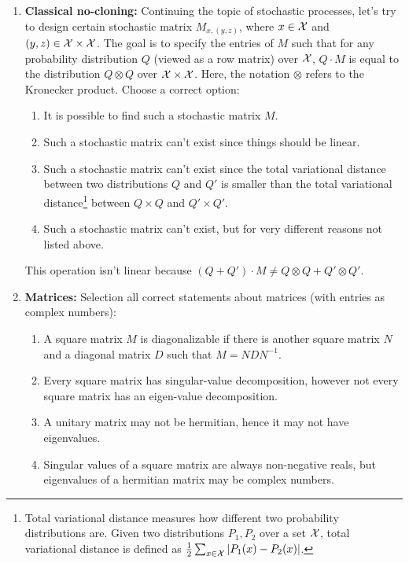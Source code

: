 \documentclass[11pt, svgnames]{article}
\begin{document}
\begin{enumerate}
\item {\bf Classical no-cloning:} Continuing the topic of stochastic processes, let's try to design certain stochastic matrix $M_{x,(y,z)}$, where $x\in \mathcal{X}$ and $(y,z)\in \mathcal{X}\times \mathcal{X}$. The goal is to specify the entries of $M$ such that for any probability distribution $Q$ (viewed as a row matrix) over $\mathcal{X}$, $Q\cdot M$ is equal to the distribution $Q\otimes Q$ over $\mathcal{X}\times \mathcal{X}$. Here, the notation $\otimes$ refers to the Kronecker product. Choose a correct option:  
\begin{enumerate}
\item It is possible to find such a stochastic matrix $M$.
\item Such a stochastic matrix can't exist since things should be linear.
\item Such a stochastic matrix can't exist since the total variational distance between two distributions $Q$ and $Q'$ is smaller than the total variational distance\footnote{Total variational distance measures how different two probability distributions are. Given two distributions $P_1, P_2$ over a set $\mathcal{X}$, total variational distance is defined as $\frac{1}{2}\sum_{x\in \mathcal{X}} |P_1(x)-P_2(x)|$.} between $Q\times Q$ and $Q'\times Q'$.
\item Such a stochastic matrix can't exist, but for very different reasons not listed above.
\end{enumerate}


This operation isn't linear because $(Q+Q')\cdot M\neq Q\otimes Q+Q'\otimes Q'$.

\item {\bf Matrices:} Selection all correct statements about matrices (with entries as complex numbers):
\begin{enumerate}
\item A square matrix $M$ is diagonalizable if there is another square matrix $N$ and a diagonal matrix $D$ such that $M=N D N^{-1}$.
\item Every square matrix has singular-value decomposition, however not every square matrix has an eigen-value decomposition. 
\item A unitary matrix may not be hermitian, hence it may not have eigenvalues.
\item Singular values of a square matrix are always non-negative reals, but eigenvalues of a hermitian matrix may be complex numbers.
\end{enumerate}


\end{enumerate}
\end{document}
